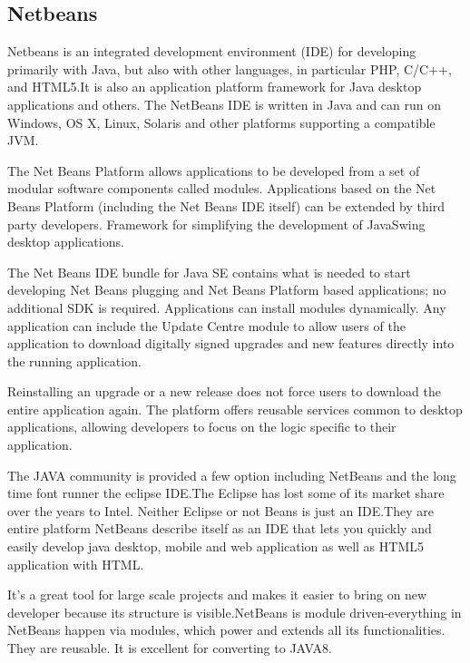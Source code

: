 \documentclass[a4paper,12pt]{article}
\begin{document}
\subsection{Netbeans}\vspace{5mm}
Netbeans is an integrated development environment (IDE) for developing primarily with Java, but also with other languages, in particular PHP, C/C++, and HTML5.It is also an application platform framework for Java desktop applications and others. The NetBeans IDE is written in Java and can run on Windows, OS X, Linux, Solaris and other platforms supporting a compatible JVM. \par\vspace{2mm}
The Net Beans Platform allows applications to be developed from a set of modular software components called modules. Applications based on the Net Beans Platform (including the Net Beans IDE itself) can be extended by third party developers. Framework for simplifying the development of JavaSwing desktop applications.
\par\vspace{2mm}
 The Net Beans IDE bundle for Java SE contains what is needed to start developing Net Beans plugging and Net Beans Platform based applications; no additional SDK is required. Applications can install modules dynamically. Any application can include the Update Centre module to allow users of the application to download digitally signed upgrades and new features directly into the running application.
\par\vspace{2mm}
 Reinstalling an upgrade or a new release does not force users to download the entire application again. The platform offers reusable services common to desktop applications, allowing developers to focus on the logic specific to their application. 
\par\vspace{2mm}The JAVA community is provided a few option including NetBeans and the long time font runner the eclipse IDE.The Eclipse has lost some of its market share over the years to Intel.
Neither Eclipse or not Beans is just an IDE.They are entire platform NetBeans describe itself as an IDE that lets you quickly and easily develop java desktop, mobile and web application as well as HTML5 application with HTML.\par\vspace{2mm}

It’s a great tool for large scale projects and makes it easier to bring on new developer because its structure is visible.NetBeans is module driven-everything in NetBeans happen via modules, which power and extends all its functionalities. They are reusable.
It is excellent for converting to JAVA8. 
\par\vspace{2mm}
\end{document}
